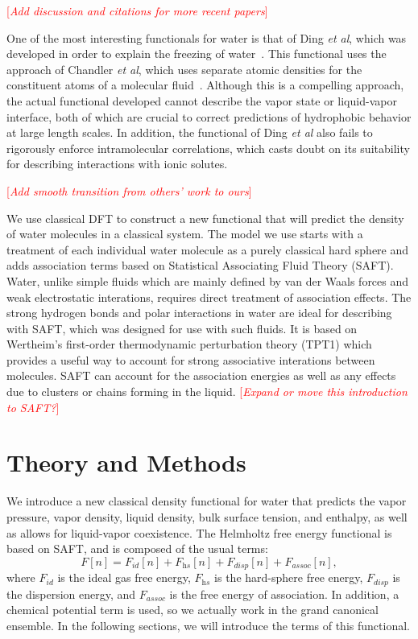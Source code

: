\documentclass[letterpaper,twocolumn,amsmath,amssymb,prb]{revtex4-1}
\newcommand{\needsworknow}[1]{\textcolor{red}{[\emph{#1}]}}
\begin{document}
\needsworknow{Add discussion and citations for more recent papers}

One of the most interesting functionals for water is that of Ding \emph{et
al}, which was developed in order to explain the freezing of
water~\cite{ding1987}.  This functional uses the approach of Chandler
\emph{et al}, which uses separate atomic densities for the constituent
atoms of a molecular fluid~\cite{chandler1986a, chandler1986b}.  Although
this is a compelling approach, the actual functional developed cannot
describe the vapor state or liquid-vapor interface, both of which are
crucial to correct predictions of hydrophobic behavior at large length
scales.  In addition, the functional of Ding \emph{et al} also fails to
rigorously enforce intramolecular correlations, which casts doubt on its
suitability for describing interactions with ionic solutes.

\needsworknow{Add smooth transition from others' work to ours}

We use classical DFT to construct a new functional that will predict
the density of water molecules in a classical system.  The model we use
starts with a treatment of each individual water molecule as a purely
classical hard sphere and adds association terms based on Statistical 
Associating Fluid Theory (SAFT). Water, unlike simple
fluids which are mainly defined by van der Waals forces and weak electrostatic
interations, requires direct treatment of association effects. The strong 
hydrogen bonds and polar
interactions in water are ideal for describing with SAFT, which was designed for
use with such fluids. It is based on Wertheim's first-order
thermodynamic perturbation theory (TPT1)
\cite{wertheim1984fluidsI,wertheim1984fluidsII,wertheim1986fluidsIII,
wertheim1986fluidsIV} which provides a useful way to account for strong
associative interations between molecules. SAFT can account for the association energies
as well as any effects due to clusters or chains forming
in the liquid\cite{muller2001molecular}. \needsworknow{Expand or move this 
introduction to SAFT?}

\section{Theory and Methods}
We introduce a new classical density functional for water that
predicts the vapor pressure, vapor density, liquid density, bulk
surface tension, and enthalpy, as well as allows for liquid-vapor
coexistence.  The Helmholtz free energy functional is based on SAFT,
and is composed of the usual terms:
\begin{equation}
  F[n] = F_\textit{id}[n] + F_\textit{hs}[n]  +
F_\textit{disp}[n]+ F_\textit{assoc}[n],
\end{equation}
where $F_\textit{id}$ is the ideal gas free energy, $F_\textit{hs}$ is
the hard-sphere free energy, $F_\textit{disp}$ is the dispersion energy,
and $F_\textit{assoc}$ is the free energy of association.  In
addition, a chemical potential term is used, so we actually work in
the grand canonical ensemble.  In the following sections, we will
introduce the terms of this functional.
\end{document}
